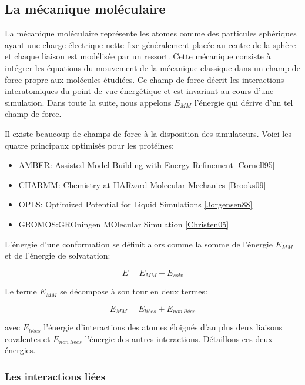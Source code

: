\subsection{La mécanique moléculaire}
\label{sub:mecamol}
La mécanique moléculaire représente les atomes comme des particules sphériques ayant une charge électrique nette fixe généralement placée au centre de la sphère et chaque liaison est modélisée par un ressort.
Cette mécanique consiste à intégrer les équations du mouvement de la mécanique classique dans un champ de force propre aux molécules étudiées. Ce champ de force décrit les interactions interatomiques du point de vue énergétique et est invariant au cours d'une simulation.
Dans toute la suite, nous appelons $E_{MM}$ l'énergie qui dérive d'un tel champ de force.

Il existe beaucoup de champs de force à la disposition des simulateurs. Voici les quatre principaux optimisés pour les protéines:

\begin{itemize}
\item AMBER: Assisted Model Building with Energy Refinement \ref{Cornell95}
\item CHARMM: Chemistry at HARvard Molecular Mechanics \ref{Brooks09}
\item OPLS: Optimized Potential for Liquid Simulations \ref{Jorgensen88}
\item GROMOS:GROningen MOlecular Simulation \ref{Christen05}
\end{itemize}

L'énergie d'une conformation se définit alors comme la somme de l'énergie $E_{MM}$  et de l'énergie de solvatation:

\begin{equation}
  E = E_{MM} + E_{solv}
\end{equation}

Le terme $E_{MM}$ se décompose à son tour en deux termes:

\begin{equation}
  E_{MM} = E_{liées} + E_{non\ liées}
\end{equation}

avec $E_{liées}$ l'énergie d'interactions des atomes éloignés d'au plus deux liaisons covalentes et $E_{non\ liées}$  l'énergie des autres interactions. Détaillons ces deux énergies.

\subsubsection{Les interactions liées }

